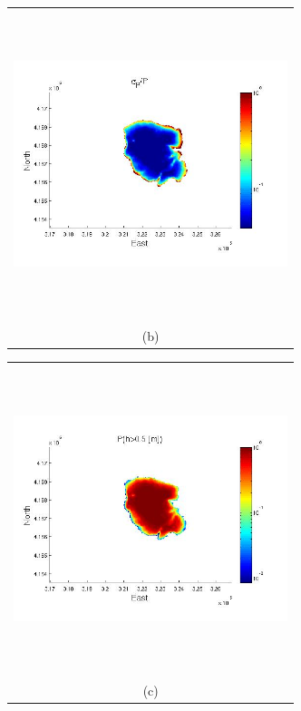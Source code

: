 \documentclass[12pt]{article}
\newcommand{\Pic}[2][0.85]{\begin{center}\texttt{[image: \#2]}
 \end{center} }
\begin{document}
\begin{figure}[H]
\begin{minipage}{0.6\textwidth}
\begin{tabular}{c}
	\includegraphics[width=8cm,height=9cm,keepaspectratio]{figs/Mammoth_0_sigma_5m.jpg}\\
        (b)
        \end{tabular}
    \end{minipage} 
        \begin{minipage}[b]{0.6\textwidth}
        \begin{tabular}{c}
       \includegraphics[width=8cm,height=9cm,keepaspectratio]{figs/Mammoth_3_P_5m.jpg}\\
        (c)
        \end{tabular}
    \end{minipage}
    \begin{minipage}{0.6\textwidth}
        \begin{tabular}{c}

\end{tabular}
\end{minipage}
\end{figure}
\end{document}

